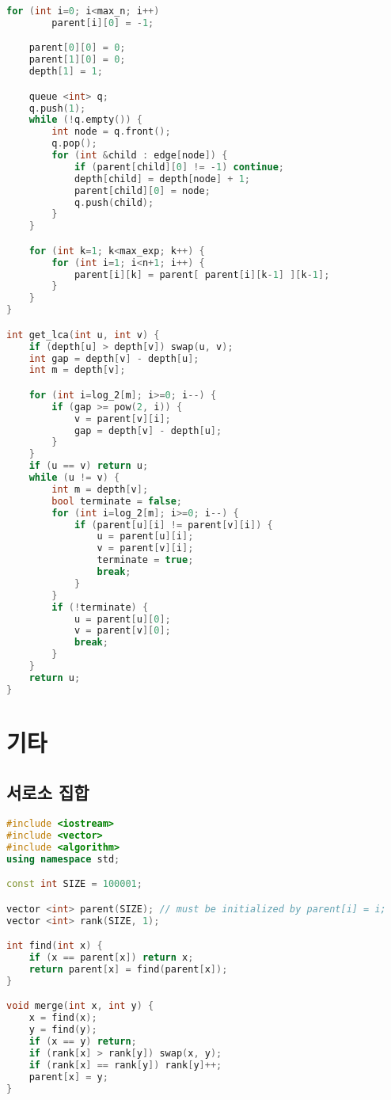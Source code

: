\documentclass[]{article}
\begin{document}
\begin{multicols*}{2}
\begin{lstlisting}[language=c++]
    for (int i=0; i<max_n; i++)
        parent[i][0] = -1;

    parent[0][0] = 0;
    parent[1][0] = 0;
    depth[1] = 1;

    queue <int> q;
    q.push(1);
    while (!q.empty()) {
        int node = q.front();
        q.pop();
        for (int &child : edge[node]) {
            if (parent[child][0] != -1) continue;
            depth[child] = depth[node] + 1;
            parent[child][0] = node;
            q.push(child);
        }
    }

    for (int k=1; k<max_exp; k++) {
        for (int i=1; i<n+1; i++) {
            parent[i][k] = parent[ parent[i][k-1] ][k-1];
        }
    }
}

int get_lca(int u, int v) {
    if (depth[u] > depth[v]) swap(u, v);
    int gap = depth[v] - depth[u];
    int m = depth[v];

    for (int i=log_2[m]; i>=0; i--) {
        if (gap >= pow(2, i)) {
            v = parent[v][i];
            gap = depth[v] - depth[u];
        }
    }
    if (u == v) return u;
    while (u != v) {
        int m = depth[v];
        bool terminate = false;
        for (int i=log_2[m]; i>=0; i--) {
            if (parent[u][i] != parent[v][i]) {
                u = parent[u][i];
                v = parent[v][i];
                terminate = true;
                break;
            }
        }
        if (!terminate) {
            u = parent[u][0];
            v = parent[v][0];
            break;
        }
    }
    return u;
}
\end{lstlisting}
\columnbreak
\section{기타}
\subsection{서로소 집합}
\begin{lstlisting}[language=c++]
#include <iostream>
#include <vector>
#include <algorithm>
using namespace std;

const int SIZE = 100001;

vector <int> parent(SIZE); // must be initialized by parent[i] = i;
vector <int> rank(SIZE, 1);

int find(int x) {
    if (x == parent[x]) return x;
    return parent[x] = find(parent[x]);
}

void merge(int x, int y) {
    x = find(x);
    y = find(y);
    if (x == y) return;
    if (rank[x] > rank[y]) swap(x, y);
    if (rank[x] == rank[y]) rank[y]++;
    parent[x] = y;
}
\end{lstlisting}

\end{multicols*}
\end{document}
